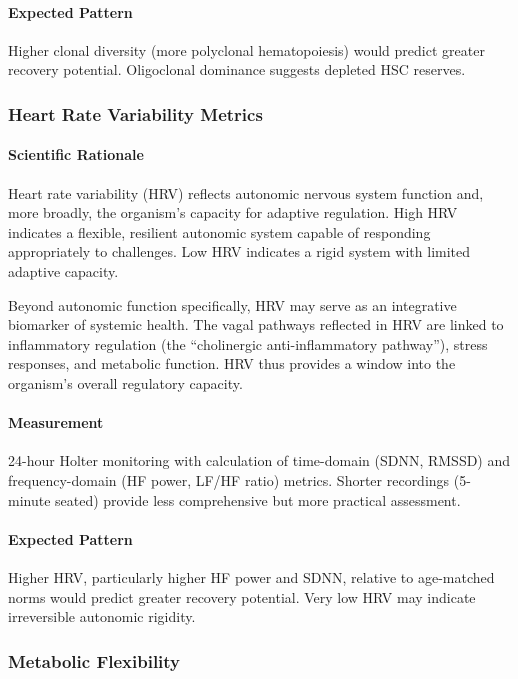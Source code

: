 \paragraph{Expected Pattern}
Higher clonal diversity (more polyclonal hematopoiesis) would predict greater recovery potential. Oligoclonal dominance suggests depleted HSC reserves.

\subsubsection{Heart Rate Variability Metrics}

\paragraph{Scientific Rationale}
Heart rate variability (HRV) reflects autonomic nervous system function and, more broadly, the organism's capacity for adaptive regulation. High HRV indicates a flexible, resilient autonomic system capable of responding appropriately to challenges. Low HRV indicates a rigid system with limited adaptive capacity.

Beyond autonomic function specifically, HRV may serve as an integrative biomarker of systemic health. The vagal pathways reflected in HRV are linked to inflammatory regulation (the ``cholinergic anti-inflammatory pathway''), stress responses, and metabolic function. HRV thus provides a window into the organism's overall regulatory capacity.

\paragraph{Measurement}
24-hour Holter monitoring with calculation of time-domain (SDNN, RMSSD) and frequency-domain (HF power, LF/HF ratio) metrics. Shorter recordings (5-minute seated) provide less comprehensive but more practical assessment.

\paragraph{Expected Pattern}
Higher HRV, particularly higher HF power and SDNN, relative to age-matched norms would predict greater recovery potential. Very low HRV may indicate irreversible autonomic rigidity.

\subsubsection{Metabolic Flexibility}

